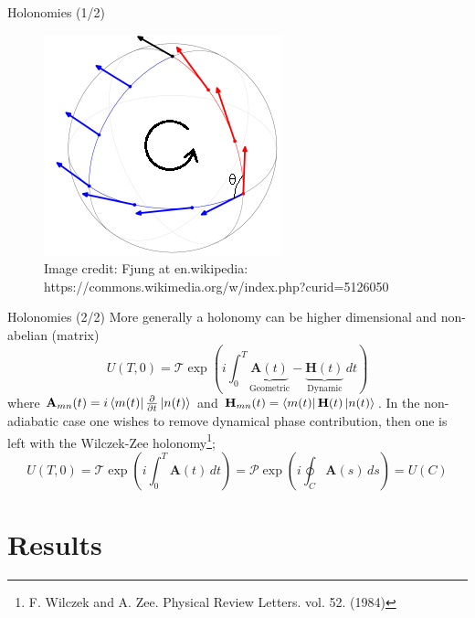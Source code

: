 \documentclass[t]{beamer}
\begin{document}
\begin{frame}{Holonomies (1/2)}
\begin{figure}
\begin{center}
\includegraphics[scale=6]{presentation/Connection-on-sphere.png}
\captionsetup{labelformat=empty}
\caption{{\tiny Image credit: Fjung at en.wikipedia: https://commons.wikimedia.org/w/index.php?curid=5126050}}
\end{center}
\end{figure}

\end{frame}


\begin{frame}{Holonomies (2/2)}
More generally a holonomy can be higher dimensional and non-abelian (matrix)
\begin{equation}
U(T,0) = \mathcal{T}\exp\left(i\int_{0}^{T} \underbrace{\mathbf{A}(t)}_{\text{Geometric}} - \underbrace{\mathbf{H}(t)}_{\text{Dynamic}}\,dt\right)
\end{equation}
where $\mathbf{A}_{mn}(t) = i\bra{m(t)}\pdv{}{t}\ket{n(t)}$ and
$\mathbf{H}_{mn}(t) = \bra{m(t)}\mathbf{H}(t)\ket{n(t)}$.
In the non-adiabatic case one wishes to remove dynamical phase contribution, then one is left with the Wilczek-Zee holonomy\footnote{F. Wilczek and A. Zee. Physical Review Letters. vol. 52. (1984)};
\begin{equation}
U(T,0) = \mathcal{T}\exp\left(i\int_{0}^{T}\mathbf{A}(t)\,dt\right) = \mathcal{P}\exp\left(i\oint_{C}\mathbf{A}(s)\,ds\right) = U(C)
\end{equation}
\end{frame}


\section{Results}

\begin{frame}{}
\tableofcontents[ 
currentsubsection, 
hideothersubsections, 
sectionstyle=show/shaded, 
subsectionstyle=show/shaded, 
] 
\end{frame}
\end{document}
